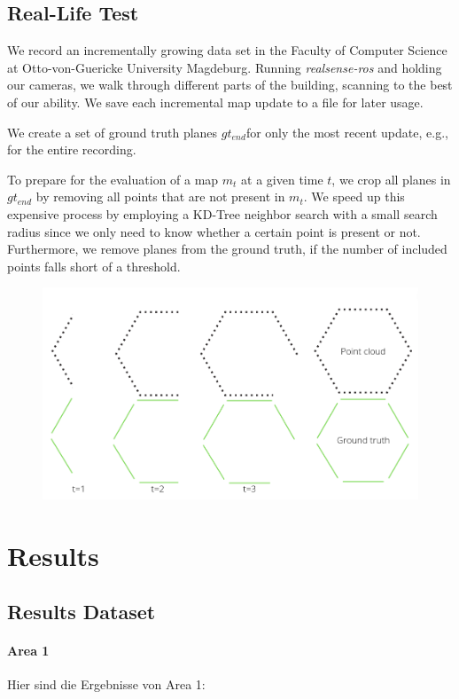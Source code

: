 \documentclass[main.tex]{subfiles}
\begin{document}
\subsection{Real-Life Test}
We record an incrementally growing data set in the Faculty of Computer Science at Otto-von-Guericke University Magdeburg.
Running \textit{realsense-ros} and holding our cameras, we walk through different parts of the building, scanning to the best of our ability.
We save each incremental map update to a file for later usage.

We create a set of ground truth planes $gt_{end}$for only the most recent update, e.g., for the entire recording.

To prepare for the evaluation of a map $m_t$ at a given time $t$, we crop all planes in $gt_{end}$ by removing all points that are not present in $m_t$. 
We speed up this expensive process by employing a KD-Tree neighbor search with a small search radius since we only need to know whether a certain point is present or not. 
Furthermore, we remove planes from the ground truth, if the number of included points falls short of a threshold.

\begin{figure}[!ht]
	\centering
	\includegraphics[width=15 cm]{images/dynamic_eval.png}
\end{figure}


\section{Results}

\subsection{Results Dataset}


\paragraph*{Area 1}
Hier sind die Ergebnisse von Area 1:
\end{document}
